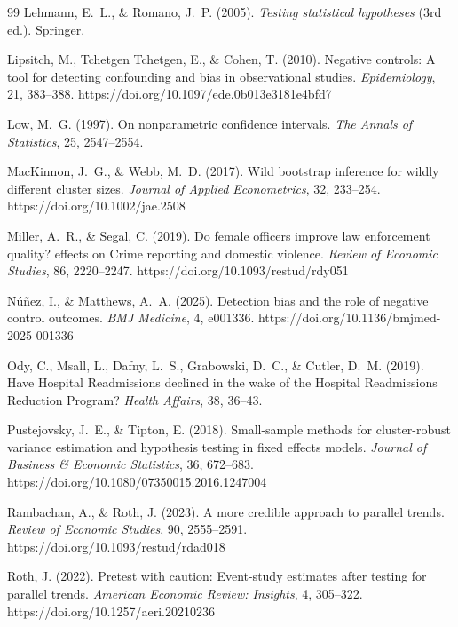 \documentclass[12pt]{article}
\theoremstyle{definition}
\numberwithin{equation}{section}
\begin{document}
\begin{thebibliography}{99}
 Lehmann, E.~L., \& Romano, J.~P. (2005). \emph{Testing statistical hypotheses} (3rd ed.). Springer.

 Lipsitch, M., Tchetgen Tchetgen, E., \& Cohen, T. (2010). Negative controls: A tool for detecting confounding and bias in observational studies. \emph{Epidemiology}, 21, 383--388. https://doi.org/10.1097/ede.0b013e3181e4bfd7

 Low, M.~G. (1997). On nonparametric confidence intervals. \emph{The Annals of Statistics}, 25, 2547--2554.

 MacKinnon, J.~G., \& Webb, M.~D. (2017). Wild bootstrap inference for wildly different cluster sizes. \emph{Journal of Applied Econometrics}, 32, 233--254. https://doi.org/10.1002/jae.2508

 Miller, A.~R., \& Segal, C. (2019). Do female officers improve law enforcement quality? effects on Crime reporting and domestic violence. \emph{Review of Economic Studies}, 86, 2220--2247. https://doi.org/10.1093/restud/rdy051

 N\'u\~nez, I., \& Matthews, A.~A. (2025). Detection bias and the role of negative control outcomes. \emph{BMJ Medicine}, 4, e001336. https://doi.org/10.1136/bmjmed-2025-001336

 Ody, C., Msall, L., Dafny, L.~S., Grabowski, D.~C., \& Cutler, D.~M. (2019). Have Hospital Readmissions declined in the wake of the Hospital Readmissions Reduction Program? \emph{Health Affairs}, 38, 36--43.

 Pustejovsky, J.~E., \& Tipton, E. (2018). Small-sample methods for cluster-robust variance estimation and hypothesis testing in fixed effects models. \emph{Journal of Business \& Economic Statistics}, 36, 672--683. https://doi.org/10.1080/07350015.2016.1247004

 Rambachan, A., \& Roth, J. (2023). A more credible approach to parallel trends. \emph{Review of Economic Studies}, 90, 2555--2591. https://doi.org/10.1093/restud/rdad018

 Roth, J. (2022). Pretest with caution: Event-study estimates after testing for parallel trends. \emph{American Economic Review: Insights}, 4, 305--322. https://doi.org/10.1257/aeri.20210236


\end{thebibliography}
\end{document}
